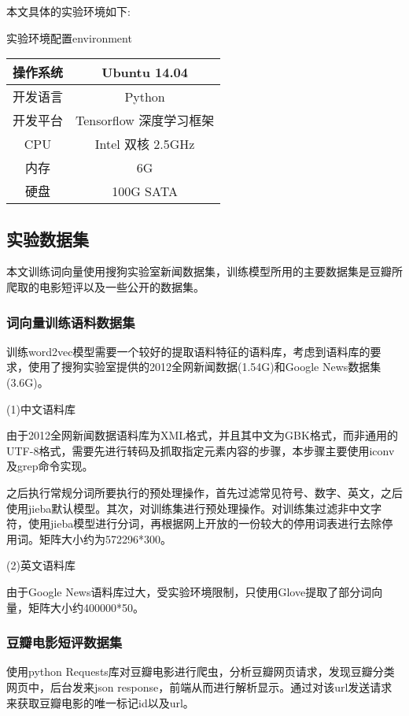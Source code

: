 \documentclass[a4paper,AutoFakeBold,oneside,12pt]{book}
\begin{document}
本文具体的实验环境如下:

\begin{bupttable}{实验环境配置}{environment}
    \begin{tabular}{|c|c|}
		\hline 操作系统 & Ubuntu 14.04\\
		\hline 开发语言 & Python \\
		\hline 开发平台 & Tensorflow 深度学习框架 \\
		\hline CPU  & Intel 双核 2.5GHz \\
        \hline 内存 & 6G \\
        \hline 硬盘 & 100G SATA \\
		\hline
    \end{tabular}
\end{bupttable}

\subsection{实验数据集}
本文训练词向量使用搜狗实验室新闻数据集，训练模型所用的主要数据集是豆瓣所爬取的电影短评以及一些公开的数据集。

\subsubsection{词向量训练语料数据集}
训练word2vec模型需要一个较好的提取语料特征的语料库，考虑到语料库的要求，使用了搜狗实验室提供的2012全网新闻数据(1.54G)和Google News数据集(3.6G)。

(1)中文语料库

由于2012全网新闻数据语料库为XML格式，并且其中文为GBK格式，而非通用的UTF-8格式，需要先进行转码及抓取指定元素内容的步骤，本步骤主要使用iconv及grep命令实现。

之后执行常规分词所要执行的预处理操作，首先过滤常见符号、数字、英文，之后使用jieba默认模型。其次，对训练集进行预处理操作。对训练集过滤非中文字符，使用jieba模型进行分词，再根据网上开放的一份较大的停用词表进行去除停用词。矩阵大小约为572296*300。


(2)英文语料库

由于Google News语料库过大，受实验环境限制，只使用Glove提取了部分词向量，矩阵大小约400000*50。

\subsubsection{豆瓣电影短评数据集}

使用python Requests库对豆瓣电影进行爬虫，分析豆瓣网页请求，发现豆瓣分类网页中，后台发来json response，前端从而进行解析显示。通过对该url发送请求来获取豆瓣电影的唯一标记id以及url。
\end{document}
